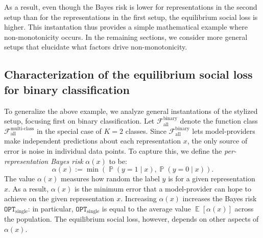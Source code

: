 \documentclass[letterpaper,11pt]{article}
\theoremstyle{plain}
\DeclareMathOperator*{\E}{\mathbb{E}}
\DeclareMathOperator*{\Prob}{\mathbb{P}}
\begin{document}
As a result, even though the Bayes risk is lower for representations in the second setup than for the representations in the first setup, the equilibrium social loss is higher. This instantation thus provides a simple mathematical example where non-monotonicity occurs. In the remaining sections, we consider more general setups that elucidate what factors drive non-monotonicity. 

\subsection{Characterization of the equilibrium social loss for binary classification}\label{subsec:idealized}

To generalize the above example, we analyze general instantations of the stylized setup, focusing first on binary classification. Let $\mathcal{F}^{\text{binary}}_{\text{all}}$ denote the function class $\mathcal{F}^{\text{multi-class}}_{\text{all}}$ in the special case of $K = 2$ classes. Since $\mathcal{F}^{\text{binary}}_{\text{all}}$ lets model-providers make independent predictions about each representation $x$, the only source of error is noise in individual data points. To capture this, we define the \emph{per-representation Bayes risk} $\alpha(x)$ to be: 
\begin{equation}
\label{eq:alphabayes}
 \alpha(x) := \min(\Prob(y = 1 \mid x), \Prob(y = 0 \mid x)). 
\end{equation}
The value $\alpha(x)$ measures how random the label $y$ is for a given representation $x$. As a result, $\alpha(x)$ is the minimum error that a model-provider can hope to achieve on the given representation $x$. Increasing $\alpha(x)$ increases the Bayes risk $\texttt{OPT}_{\text{single}}$: in particular,  $\texttt{OPT}_{\text{single}}$ is equal to the average value $\E[\alpha(x)]$ across the population. The equilibrium social loss, however, depends on other aspects of $\alpha(x)$.
\end{document}
